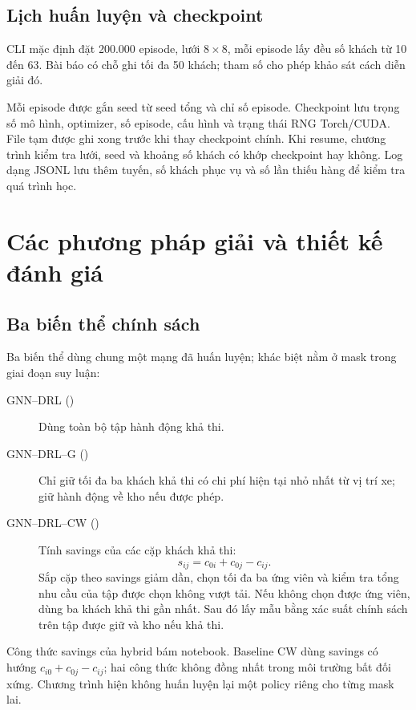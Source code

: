 \documentclass[12pt,a4paper,oneside]{report}
\newcommand{\file}[1]{\texttt{\detokenize{#1}}}
\begin{document}
\section{Lịch huấn luyện và checkpoint}
CLI mặc định đặt 200.000 episode, lưới $8\times8$, mỗi episode lấy đều
số khách từ 10 đến 63. Bài báo có chỗ ghi tối đa 50 khách; tham số
\file{--max-customers 50} cho phép khảo sát cách diễn giải đó.

Mỗi episode được gắn seed từ seed tổng và chỉ số episode. Checkpoint
lưu trọng số mô hình, optimizer, số episode, cấu hình và trạng thái RNG
Torch/CUDA. File tạm được ghi xong trước khi thay checkpoint chính.
Khi resume, chương trình kiểm tra lưới, seed và khoảng số khách có khớp
checkpoint hay không. Log dạng JSONL lưu thêm tuyến, số khách phục vụ và
số lần thiếu hàng để kiểm tra quá trình học.

\chapter{Các phương pháp giải và thiết kế đánh giá}
\section{Ba biến thể chính sách}
Ba biến thể dùng chung một mạng đã huấn luyện; khác biệt nằm ở mask
trong giai đoạn suy luận:
\begin{description}
\item[GNN--DRL (\file{gnn})] Dùng toàn bộ tập hành động khả thi.
\item[GNN--DRL--G (\file{gnn_g})] Chỉ giữ tối đa ba khách khả thi có chi
phí hiện tại nhỏ nhất từ vị trí xe; giữ hành động về kho nếu được phép.
\item[GNN--DRL--CW (\file{gnn_cw})] Tính savings của các cặp khách khả thi:
\begin{equation}
s_{ij}=c_{0i}+c_{0j}-c_{ij}.
\end{equation}
Sắp cặp theo savings giảm dần, chọn tối đa ba ứng viên và kiểm tra tổng
nhu cầu của tập được chọn không vượt tải. Nếu không chọn được ứng viên,
dùng ba khách khả thi gần nhất. Sau đó lấy mẫu bằng xác suất chính sách
trên tập được giữ và kho nếu khả thi.
\end{description}
Công thức savings của hybrid bám notebook. Baseline CW dùng savings
có hướng $c_{i0}+c_{0j}-c_{ij}$; hai công thức không đồng nhất trong
môi trường bất đối xứng. Chương trình hiện không huấn luyện lại một
policy riêng cho từng mask lai.
\end{document}
